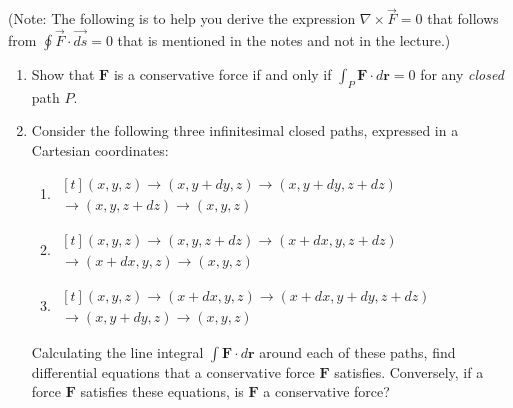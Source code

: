 \documentclass{article}
\begin{document}
\begin{problem}
(Note: The following is to help you derive the expression $\nabla\times\vec{F}=0$ that follows from $\oint\vec{F}\cdot\overrightarrow{ds}=0$ that is mentioned in the notes and not in the lecture.)

\begin{enumerate}
  \item[(a)] Show that $\mathbf{F}$ is a conservative force if and only if $\int_P\mathbf{F}\cdot d\boldsymbol{r}=0$ for any \textit{closed} path $P$.
  \item[(b)] Consider the following three infinitesimal closed paths, expressed in a Cartesian coordinates:
  \begin{enumerate}

    \item[1.] $\begin{gathered}[t]
      (x,y,z)\to(x,y+dy,z)\to(x,y+dy,z+dz)\\
      \to(x,y,z+dz)\to(x,y,z)
    \end{gathered}$
    \item[2.] $\begin{gathered}[t]
      (x,y,z)\to(x,y,z+dz)\to(x+dx,y,z+dz)\\
      \to(x+dx,y,z)\to(x,y,z)
    \end{gathered}$
    \item[3.] $\begin{gathered}[t]
      (x,y,z)\to(x+dx,y,z)\to(x+dx,y+dy,z+dz)\\
      \to(x,y+dy,z)\to(x,y,z)
    \end{gathered}$
  \end{enumerate}
  Calculating the line integral $\int\mathbf{F}\cdot d\boldsymbol{r}$ around each of these paths, find differential equations that a conservative force $\mathbf{F}$ satisfies. Conversely, if a force $\mathbf{F}$ satisfies these equations, is $\mathbf{F}$ a conservative force?
\end{enumerate}
\end{problem}
\end{document}
